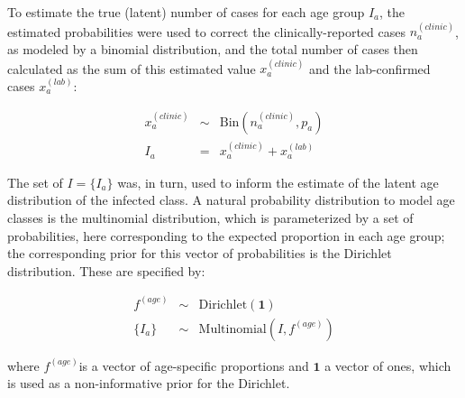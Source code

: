 To estimate the true (latent) number of cases for each age group \(I_a\), the estimated probabilities were used to correct the clinically-reported cases \(n_a^{(clinic)}\), as modeled by a binomial distribution, and the total number of cases then calculated as the sum of this estimated value \(x_a^{(clinic)}\) and the lab-confirmed cases \(x_a^{(lab)}\):

\begin{eqnarray}
x_a^{(clinic)} &\sim& \text{Bin}(n_a^{(clinic)},p_a) \\
I_a &=& x_a^{(clinic)}+x_a^{(lab)}
\end{eqnarray}

The set of \(I = \{I_a\}\) was, in turn, used to inform the estimate of the latent age distribution of the infected class. A natural probability distribution to model age classes is the multinomial distribution, which is parameterized by a set of probabilities, here corresponding to the expected proportion in each age group; the corresponding prior for this vector of probabilities is the  Dirichlet distribution. These are specified by:

\begin{eqnarray}
f^{(age)} &\sim& \text{Dirichlet}(\mathbf{1}) \\
\{I_a\} &\sim& \text{Multinomial}(I, f^{(age)})
\end{eqnarray}

where \(f^{(age)}\)is a vector of age-specific proportions and \(\mathbf{1}\) a vector of ones, which is used as a non-informative prior for the Dirichlet.